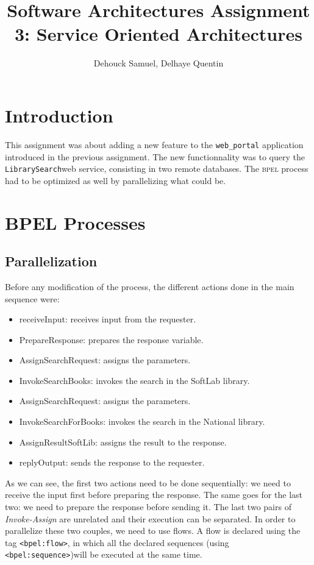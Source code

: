 \documentclass[a4paper,10pt]{article}
\title{Software Architectures
Assignment 3: Service Oriented Architectures}
\author{Dehouck Samuel, Delhaye Quentin}
\begin{document}
\maketitle

\section{Introduction}
This assignment was about adding a new feature to the \texttt{web\_portal} application introduced in the previous assignment.
The new functionnality was to query the \texttt{LibrarySearch}web service, consisting in two remote databases.
The \textsc{bpel} process had to be optimized as well by parallelizing what could be.


\section{BPEL Processes}

\subsection{Parallelization}
Before any modification of the process, the different actions done in the main sequence were:
\begin{itemize}
 \item receiveInput: receives input from the requester.
 \item PrepareResponse: prepares the response variable.
 \item AssignSearchRequest: assigns the parameters.
 \item InvokeSearchBooks: invokes the search in the SoftLab library. 
 \item AssignSearchRequest: assigns the parameters.
 \item InvokeSearchForBooks: invokes the search in the National library.
 \item AssignResultSoftLib: assigns the result to the response.
 \item replyOutput: sends the response to the requester.
\end{itemize}

As we can see, the first two actions need to be done sequentially: we need to receive the input first before preparing the response. The same goes for the last two: we need to prepare the response before sending it.
The last two pairs of \textit{Invoke-Assign} are unrelated and their execution can be separated.
In order to parallelize these two couples, we need to use flows. A flow is declared using the tag \texttt{\textless bpel:flow\textgreater}, in which all the declared sequences (using \texttt{\textless bpel:sequence\textgreater})will be executed at the same time.
\end{document}
